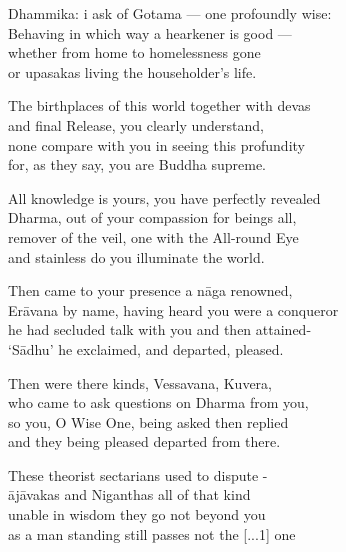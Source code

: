 \begin{MyDescription}{Dhammika:}
i ask of Gotama — one profoundly wise:\\
Behaving in which way a hearkener is good —\\
whether from home to homelessness gone\\
or upasakas living the householder's life.
\end{MyDescription}

\begin{MyDescription}{}
The birthplaces of this world together with devas\\
and final Release, you clearly understand,\\
none compare with you in seeing this profundity\\
for, as they say, you are Buddha supreme.
\end{MyDescription}

\begin{MyDescription}{}
All knowledge is yours, you have perfectly revealed\\
Dharma, out of your compassion for beings all,\\
remover of the veil, one with the All-round Eye\\
and stainless do you illuminate the world.
\end{MyDescription}

\begin{MyDescription}{}
Then came to your presence a n\=aga renowned,\\
Er\=avana by name, having heard you were a conqueror\\
he had secluded talk with you and then attained-\\
`S\=adhu' he exclaimed, and departed, pleased.
\end{MyDescription}

\begin{MyDescription}{}
Then were there kinds, Vessavana, Kuvera,\\
who came to ask questions on Dharma from you,\\
so you, O Wise One, being asked then replied\\
and they being pleased departed from there.
\end{MyDescription}

\begin{MyDescription}{}
 These theorist sectarians used to dispute -\\
 \=aj\=avakas and Niganthas all of that kind\\
 unable in wisdom they go not beyond you\\
 as a man standing still passes not the [...1] one
\end{MyDescription}

